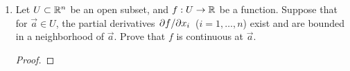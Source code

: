 \documentclass[../psets.tex]{subfiles}
\begin{document}
\begin{enumerate}
\begin{enumerate}
\begin{proof}
            \begin{align*}
                \left| \left( \pdv{f}{x} \right)_\vec{h} \right| &= \left| 2\cdot\frac{1}{n\pi}\sin\left( \frac{1}{\sqrt{(1/n\pi)^2+0^2}} \right)-\frac{1/n\pi}{\sqrt{(1/n\pi)^2+0^2}}\cos\left( \frac{1}{\sqrt{(1/n\pi)^2+0^2}} \right) \right|\\
                &= \left| \frac{2}{n\pi}\sin(n\pi)-\frac{1}{1}\cos(n\pi) \right|\\
                &= \left| \frac{2}{n\pi}\cdot 0-1\cdot\pm 1 \right|\\
                &= 1
            \end{align*}
            as desired.
        \end{proof}
    \end{enumerate}
    \item Let $U\subset\mathbb{R}^n$ be an open subset, and $f:U\to\mathbb{R}$ be a function. Suppose that for $\vec{a}\in U$, the partial derivatives $\pdv*{f}{x_i}$ ($i=1,\dots,n$) exist and are bounded in a neighborhood of $\vec{a}$. Prove that $f$ is continuous at $\vec{a}$.
    \begin{proof}




\end{proof}
\end{enumerate}
\end{document}
